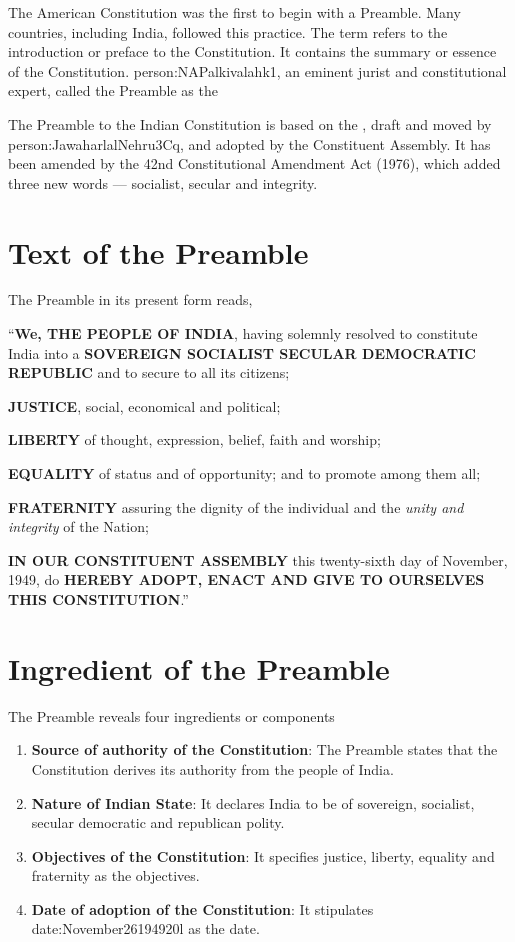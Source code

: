 The American Constitution was the first to begin with a Preamble. Many countries, including India, followed this practice. The term  refers to the introduction or preface to the Constitution. It contains the summary or essence of the Constitution. \gls{person:NAPalkivalahk1}, an eminent jurist and constitutional expert, called the Preamble as the 

The Preamble to the Indian Constitution is based on the , draft and moved by \gls{person:JawaharlalNehru3Cq}, and adopted by the Constituent Assembly. It has been amended by the 42nd Constitutional Amendment Act (1976), which added three new words — socialist, secular and integrity.

\section{Text of the Preamble}

The Preamble in its present form reads,

\textquotedblleft \textbf{We, THE PEOPLE OF INDIA}, having solemnly resolved to constitute\\India into a \textbf{SOVEREIGN SOCIALIST SECULAR DEMOCRATIC REPUBLIC} and to secure to all its citizens;
\begin{list}{}{}
  \item \textbf{JUSTICE}, social, economical and political;
  \item \textbf{LIBERTY} of thought, expression, belief, faith and worship;
  \item \textbf{EQUALITY} of status and of opportunity; and to promote among them all;
  \item \textbf{FRATERNITY} assuring the dignity of the individual and the \textit{unity and integrity} of the Nation;
\end{list}
\textbf{IN OUR CONSTITUENT ASSEMBLY} this twenty-sixth day of November, 1949, do \textbf{HEREBY ADOPT, ENACT AND GIVE TO OURSELVES THIS CONSTITUTION}.\textquotedblright

\section{Ingredient of the Preamble}

The Preamble reveals four ingredients or components

\begin{enumerate}
  \item \textbf{Source of authority of the Constitution}: The Preamble states that the Constitution derives its authority from the people of India.
  \item \textbf{Nature of Indian State}: It declares India to be of sovereign, socialist, secular democratic and republican polity.
  \item \textbf{Objectives of the Constitution}: It specifies justice, liberty, equality and fraternity as the objectives.
  \item \textbf{Date of adoption of the Constitution}: It stipulates \gls{date:November26194920l} as the date.
\end{enumerate}


